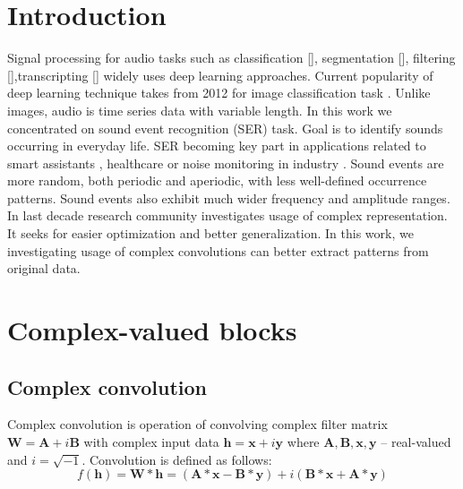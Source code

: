 \documentclass{article}
\begin{document}
\section{Introduction}
Signal processing for audio tasks such as classification [], segmentation [], filtering [],transcripting [] widely uses deep learning approaches. 
Current popularity of deep learning technique takes from 2012 for image classification task \citep{NIPS2012_c399862d}. 
Unlike images, audio is time series data with variable length. 
In this work we concentrated on sound event recognition (SER) task. Goal is to identify sounds occurring in everyday life. SER becoming key part in 
applications related to smart assistants \citep{cances2018sound}, healthcare \citep{kim2020occupant,khlaifi2018swallowing} or noise monitoring 
in industry \citet{Trufanov2021a}. 
Sound events are more random, both periodic and aperiodic, with less well-defined occurrence patterns. Sound events also exhibit much wider frequency and amplitude ranges. 
In last decade research community investigates usage of complex representation. It seeks for easier optimization and better generalization. In this work, 
we investigating usage of complex convolutions can better extract patterns from original data. 


\section{Complex-valued blocks}
\label{sec:headings}

\subsection{Complex convolution}
Complex convolution is operation of convolving complex filter matrix $\textbf{W}=\textbf{A}+i\textbf{B}$ 
with complex input data $\textbf{h}=\textbf{x}+i\textbf{y}$
 where $\textbf{A},\textbf{B},\textbf{x},\textbf{y}$ – real-valued and $i=\sqrt{-1}$. Convolution is defined as follows:
\begin{equation}
	f\left(\textbf{h}\right)=\textbf{W}\ast\textbf{h}=\left(\textbf{A}\ast\textbf{x}-\textbf{B}\ast\textbf{y}\right)+i(\textbf{B}\ast\textbf{x}+\textbf{A}\ast\textbf{y})
\end{equation}
\end{document}
